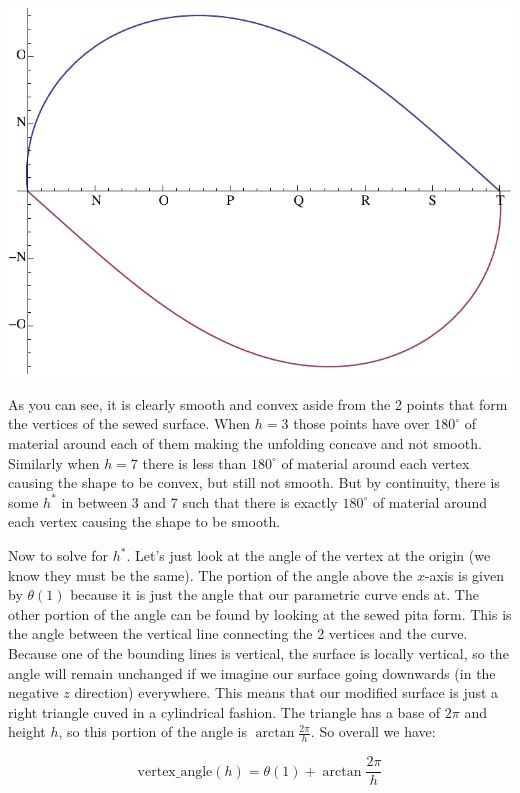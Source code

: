 \documentclass[12pt]{article}
\begin{document}
\begin{center}
\includegraphics[scale=.4]{unfold_h=7.pdf}
\end{center}

As you can see, it is clearly smooth and convex aside from the 2 points that form the vertices of the sewed surface. When $h=3$ those points have over $180^\circ$ of material around each of them making the unfolding concave and not smooth. Similarly when $h=7$ there is less than $180^\circ$ of material around each vertex causing the shape to be convex, but still not smooth. But by continuity, there is some $h^*$ in between 3 and 7 such that there is exactly $180^\circ$ of material around each vertex causing the shape to be smooth.

Now to solve for $h^*$. Let's just look at the angle of the vertex at the origin (we know they must be the same). The portion of the angle above the $x$-axis is given by $\theta(1)$ because it is just the angle that our parametric curve ends at. The other portion of the angle can be found by looking at the sewed pita form. This is the angle between the vertical line connecting the 2 vertices and the curve. Because one of the bounding lines is vertical, the surface is locally vertical, so the angle will remain unchanged if we imagine our surface going downwards (in the negative $z$ direction) everywhere. This means that our modified surface is just a right triangle cuved in a cylindrical fashion. The triangle has a base of $2\pi$ and height $h$, so this portion of the angle is $\arctan \frac{2\pi}{h}$. So overall we have:

$$\text{vertex\_angle}(h)= \theta(1)+\arctan \frac{2\pi}{h}$$
\end{document}
